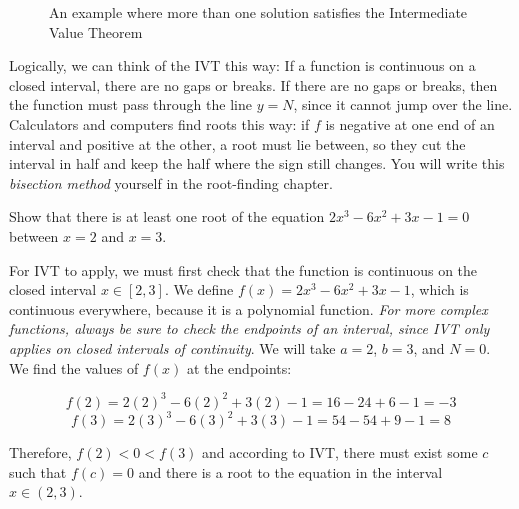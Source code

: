 \begin{figure}[H]
\centering
{}
\caption{An example where more than one solution satisfies the Intermediate 
Value Theorem}
\label{fig:IVT2}
\end{figure}

Logically, we can think of the IVT this way: If a function is continuous on a 
closed interval, there are no gaps or breaks. If there are no gaps or breaks, 
then the function must pass through the line $y=N$, since it cannot jump over 
the line. Calculators and computers find roots this way: if $f$ is negative at one
end of an interval and positive at the other, a root must lie between, so
they cut the interval in half and keep the half where the sign still
changes. You will write this \emph{bisection method} yourself in the
root-finding chapter.

\begin{Worked}
\begin{Problem}
Show that there is at least one root of the equation $2x^3 - 
6x^2 + 3x - 1 = 0$ between $x = 2$ and $x = 3$.
\end{Problem}
\begin{Solution}
For IVT to apply, we must first check that the function is 
continuous on the closed interval $x \in \left[2, 3\right]$. We define $f(x) =
2x^3-6x^2+3x-1$, which is continuous everywhere, because it is a polynomial 
function. \textit{For more complex functions, always be sure to check the 
endpoints of an interval, since IVT only applies on closed intervals of 
continuity}. We will take $a = 2$, $b = 3$, and $N = 0$. We find the values of 
$f(x)$ at the endpoints: 

$$f(2) = 2(2)^3 - 6(2)^2 + 3(2) - 1 = 16 - 24 + 6 - 1 = -3$$
$$f(3) = 2(3)^3 - 6(3)^2 + 3(3) - 1 = 54 - 54 + 9 - 1 = 8$$

Therefore, $f(2)<0<f(3)$ and according to IVT, there must exist some $c$ such 
that $f(c) = 0$ and there is a root to the equation in the interval $x \in 
\left(2, 3\right)$.
\end{Solution}
\end{Worked}


